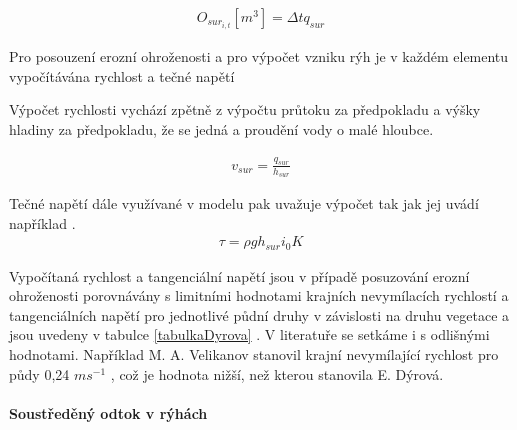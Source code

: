 \documentclass[a4paper, 12pt, twoside]{article}
\begin{document}
\begin{eqnarray}
O_{sur_{i,t}} [m^{3}] = \Delta t q_{sur}
\end{eqnarray}

Pro posouzení erozní ohroženosti a pro výpočet vzniku rýh je v každém elementu vypočítávána rychlost a tečné napětí

Výpočet rychlosti vychází zpětně z výpočtu průtoku za předpokladu a výšky hladiny za předpokladu, že se jedná a proudění vody o malé hloubce.

\begin{eqnarray}
v_{sur} =  \frac{q_{sur}}{h_{sur}} \label{eg:v}
\end{eqnarray}

Tečné napětí dále využívané v modelu pak uvažuje výpočet tak jak jej uvádí například \citep{Schwab1993}.
\begin{eqnarray}
\tau = \rho g h_{sur} i_{0} K \label{eg:tau}
\end{eqnarray}

Vypočítaná rychlost a tangenciální napětí jsou v případě posuzování erozní ohroženosti porovnávány s limitními hodnotami krajních nevymílacích rychlostí a tangenciálních napětí pro jednotlivé půdní druhy v závislosti na druhu vegetace \citep{Dyrova}
a jsou uvedeny v tabulce \ref{tabulkaDyrova}
.
V literatuře se setkáme i s odlišnými hodnotami. Například M. A. Velikanov stanovil krajní nevymílající rychlost pro půdy 0,24 $m s^{-1}$ \citep{cabik1963}, což je hodnota nižší, než kterou stanovila E. Dýrová.

\paragraph{Soustředěný odtok v rýhách}  \mbox{} \\
\end{document}
